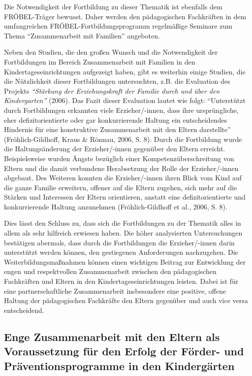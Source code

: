 \documentclass[12pt,a4paper]{article}
\begin{document}
Die Notwendigkeit der Fortbildung zu dieser Thematik ist ebenfalls dem FRÖ\-BEL-Träger bewusst. Daher werden den pädagogischen Fachkräften in dem umfangreichen FRÖBEL-Fortbildungsprogramm regelmäßige Seminare zum Thema "`Zusammenarbeit mit Familien"' angeboten.

Neben den Studien, die den großen Wunsch und die Notwendigkeit der Fortbildungen im Bereich Zusammenarbeit mit Familien in den Kindertageseinrichtungen aufgezeigt haben,  gibt es weiterhin einige Studien, die die Nützlichkeit dieser Fortbildungen untersuchten, z.B. die Evaluation des Projekts \textit{"`Stärkung der Erziehungskraft der Familie durch und über den Kindergarten"'} (2006). Das Fazit dieser Evaluation lautet wie folgt:  "`Unterstützt durch Fortbildungen erkannten viele Erzieher/-innen, dass ihre ursprüngliche, eher defizitorientierte oder gar konkurrierende Haltung ein entscheidendes Hindernis für eine konstruktive Zusammenarbeit mit den Eltern darstellte"' (Fröhlich-Gildhoff, Kraus \& Rönnau, 2006, S. 8). Durch die Fortbildung wurde die Haltungsänderung der Erzieher/-innen gegenüber den Eltern erreicht. Beispielsweise wurden Ängste bezüglich einer Kompetenzüberschreitung von Eltern und die damit verbundene Herabsetzung der Rolle der Erzieher/-innen abgebaut. Des Weiteren konnten die Erzieher/-innen ihren Blick vom Kind auf die ganze Familie erweitern, offener auf die Eltern zugehen, sich mehr auf die Stärken und Interessen der Eltern orientieren, anstatt eine defizitorientierte und konkurrierende Haltung anzunehmen (Fröhlich-Gildhoff et al., 2006, S. 8).

Dies lässt den Schluss zu, dass sich die Fortbildungen zu der Thematik alles in allem als sehr hilfreich erwiesen haben. Die höher analysierten Untersuchungen bestätigen abermals, dass durch die Fortbildungen die Erzieher/-innen darin unterstützt werden können, den gestiegenen Anforderungen nachzugehen. Die Weiterbildungsmaßnahmen können einen wichtigen Beitrag zur Entwicklung der engen und respektvollen Zusammenarbeit zwischen den pädagogischen Fachkräften und Eltern in den Kindertageseinrichtungen leisten. Dabei ist für eine partnerschaftliche Zusammenarbeit insbesondere eine positive, offene Haltung der pädagogischen Fachkräfte den Eltern gegenüber und auch vice versa entscheidend.

\subsection{Enge Zusammenarbeit mit den Eltern als Voraussetzung für den Erfolg der Förder- und Präventionsprogramme in den Kindergärten}
\end{document}
